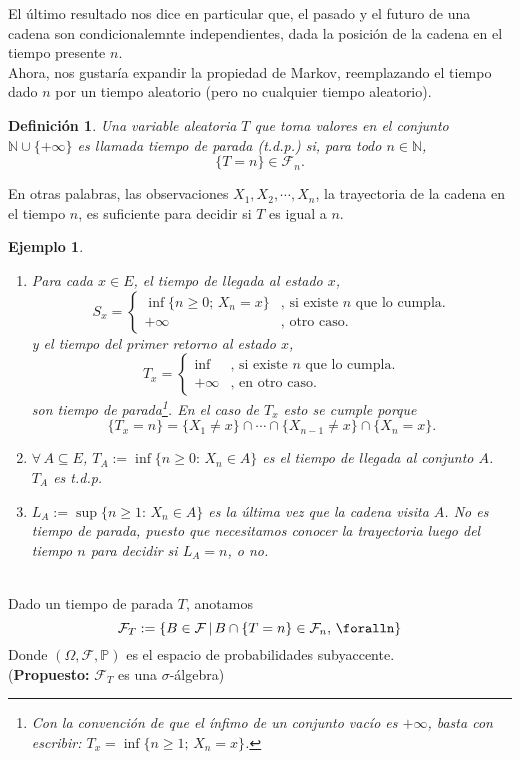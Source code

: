 \documentclass[a4paper]{article}
\newcommand{\prob}{\mathbb{P}}
\newtheorem{definicion}{Definición}
\newtheorem{ejemplo}{Ejemplo}
\numberwithin{equation}{subsection}
\numberwithin{definicion}{subsection}
\def\N{\mathbb N}
\begin{document}
El último resultado nos dice en particular que, el pasado y el futuro de una cadena son condicionalemnte independientes, dada la posición de la cadena en el tiempo presente $n$.\\ Ahora, nos gustaría expandir la propiedad de Markov, reemplazando el tiempo dado $n$ por un tiempo aleatorio (pero no cualquier tiempo aleatorio).

\begin{definicion}
Una variable aleatoria $T$ que toma valores en el conjunto $\N\cup \{+\infty\}$ es llamada tiempo de parada (t.d.p.) si, para todo $n\in \N$,
\[\{T=n\} \in \mathcal{F}_n.\]
\end{definicion}
En otras palabras, las observaciones $X_1,X_2,\cdots,X_n$, la trayectoria de la cadena en el tiempo $n$, es suficiente para decidir si $T$ es igual a $n$.

\begin{ejemplo}
    \begin{enumerate}
        \item Para cada $x\in E$, el tiempo de llegada al estado $x$,
        \[S_x = \begin{cases}
        \inf\{n\geq0;\,X_n=x\} & \text{, si existe $n$ que lo cumpla.}\\
        +\infty & \text{, otro caso.}
        \end{cases}\]
        y el tiempo del primer retorno al estado $x$,
        \[T_x = \begin{cases}
        \inf\ & \text{, si existe $n$ que lo cumpla.}\\
        +\infty & \text{, en otro caso.}
        \end{cases}\]
        son tiempo de parada\footnote{Con la convención de que el ínfimo de un conjunto vacío es $+\infty$, basta con escribir: $T_x = \inf\{n\geq 1;\,X_n=x\}$.}. En el caso de $T_x$ esto se cumple porque
        \[\{T_x = n\} = \{X_1\neq x\}\cap \cdots \cap \{X_{n-1}\neq x\}\cap\{X_n = x\}.\]
        \item $\forall\,A\subseteq E$, $T_A := \inf\{n\geq 0:\,X_n\in A\}$ es el tiempo de llegada al conjunto $A$. $T_A$ es t.d.p.
        \item $L_A:= \sup\{n\geq 1:\,X_n\in A\}$ es la última vez que  la cadena visita $A$. No es tiempo de parada, puesto que necesitamos conocer la trayectoria luego del tiempo $n$ para decidir si $L_A = n$, o no.
    \end{enumerate}
\end{ejemplo}\\ \newline \newline
Dado un tiempo de parada $T$, anotamos
\[\mathcal{F}_T := \{B \in \mathcal{F}\,|\,B\cap \{T=n\} \in \mathcal{F}_n,\, \foralln\}\]
Donde $\left(\Omega,\mathcal{F},\prob\right)$ es el espacio de probabilidades subyaccente.\\ (\textbf{Propuesto: }$\mathcal{F}_T$ es una $\sigma$-álgebra)
\end{document}
